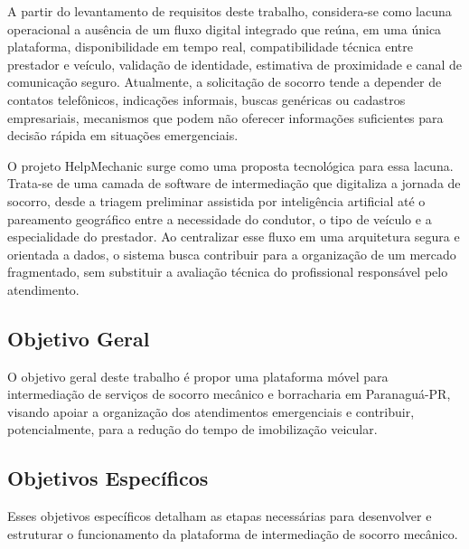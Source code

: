\documentclass[12pt, a4paper]{article}
\begin{document}
A partir do levantamento de requisitos deste trabalho, considera-se como lacuna operacional a ausência de um fluxo digital integrado que reúna, em uma única plataforma, disponibilidade em tempo real, compatibilidade técnica entre prestador e veículo, validação de identidade, estimativa de proximidade e canal de comunicação seguro. Atualmente, a solicitação de socorro tende a depender de contatos telefônicos, indicações informais, buscas genéricas ou cadastros empresariais, mecanismos que podem não oferecer informações suficientes para decisão rápida em situações emergenciais.

O projeto HelpMechanic surge como uma proposta tecnológica para essa lacuna. Trata-se de uma camada de software de intermediação que digitaliza a jornada de socorro, desde a triagem preliminar assistida por inteligência artificial até o pareamento geográfico entre a necessidade do condutor, o tipo de veículo e a especialidade do prestador. Ao centralizar esse fluxo em uma arquitetura segura e orientada a dados, o sistema busca contribuir para a organização de um mercado fragmentado, sem substituir a avaliação técnica do profissional responsável pelo atendimento.

\subsection{Objetivo Geral}
O objetivo geral deste trabalho é propor uma plataforma móvel para intermediação de serviços de socorro mecânico e borracharia em Paranaguá-PR, visando apoiar a organização dos atendimentos emergenciais e contribuir, potencialmente, para a redução do tempo de imobilização veicular.

\subsection{Objetivos Específicos}
Esses objetivos específicos detalham as etapas necessárias para desenvolver e estruturar o funcionamento da plataforma de intermediação de socorro mecânico.
\end{document}
